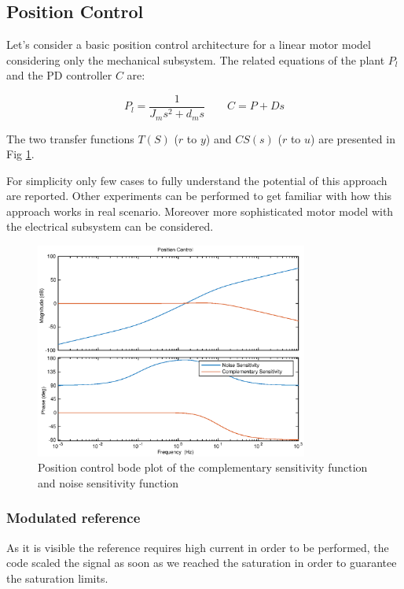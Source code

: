 \documentclass[a4paper,11pt]{article}
\begin{document}
\subsection{Position Control}
Let's consider a basic position control architecture for a linear motor model considering only the mechanical subsystem. The related equations of the plant $P_l$ and the PD controller $C$ are:

\[
P_l = \frac{1}{J_m s^2 + d_m s} \qquad
C = P + Ds
\]

\bigskip
\noindent The two transfer functions $T(S)$ ($r$ to $y$) and $CS(s)$ ($r$ to $u$) are presented in Fig \ref{fig:position_tf}.

\noindent For simplicity only few cases to fully understand the potential of this approach are reported. Other experiments can be performed to get familiar with how this approach works in real scenario. Moreover more sophisticated motor model with the electrical subsystem can be considered.

\begin{figure}[H]
\begin{center}
\includegraphics[width=0.8\textwidth]{images/position_tf.eps}
\end{center}
\caption{Position control bode plot of the complementary sensitivity function and noise sensitivity function}
\label{fig:position_tf}
\end{figure}

\newpage

\subsubsection{Modulated reference}
\noindent As it is visible the reference requires high current in order to be performed, the code scaled the signal as soon as we reached the saturation in order to guarantee the saturation limits.
\end{document}
